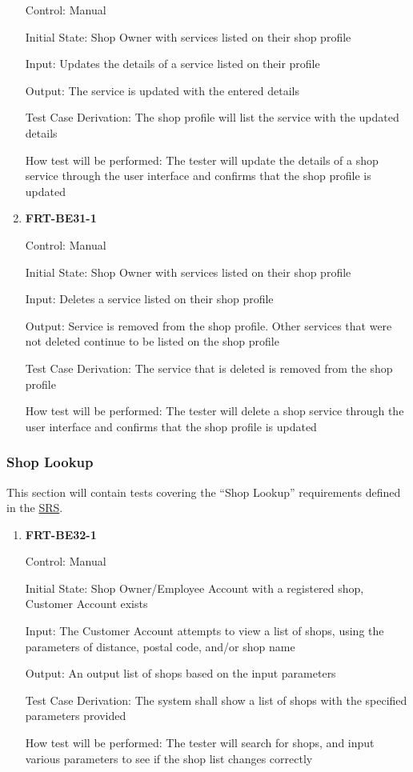 \documentclass[12pt, titlepage]{article}
\begin{document}
\begin{enumerate}
	      Control: Manual

	      Initial State: Shop Owner with services listed on their shop profile

	      Input: Updates the details of a service listed on their profile

	      Output: The service is updated with the entered details

	      Test Case Derivation: The shop profile will list the service with the updated details

	      How test will be performed: The tester will update the details of a shop service through the user
	      interface and confirms that the shop profile is updated

	\item \textbf{FRT-BE31-1}

	      Control: Manual

	      Initial State: Shop Owner with services listed on their shop profile

	      Input: Deletes a service listed on their shop profile

	      Output: Service is removed from the shop profile. Other services that were not deleted continue to
	      be listed on the shop profile

	      Test Case Derivation: The service that is deleted is removed from the shop profile

	      How test will be performed: The tester will delete a shop service through the user interface and
	      confirms that the shop profile is updated

\end{enumerate}

\subsubsection{Shop Lookup}

This section will contain tests covering the ``Shop Lookup'' requirements defined in the
\href{https://github.com/arkinmodi/project-sayyara/blob/main/docs/SRS/SRS.pdf}{SRS}.

\begin{enumerate}
	\item \textbf{FRT-BE32-1}

	      Control: Manual

	      Initial State: Shop Owner/Employee Account with a registered shop, Customer Account exists

	      Input: The Customer Account attempts to view a list of shops, using the parameters of distance,
	      postal code, and/or shop name

	      Output: An output list of shops based on the input parameters

	      Test Case Derivation: The system shall show a list of shops with the specified parameters provided

	      How test will be performed: The tester will search for shops, and input various parameters to see
	      if the shop list changes correctly
\end{enumerate}
\end{document}

